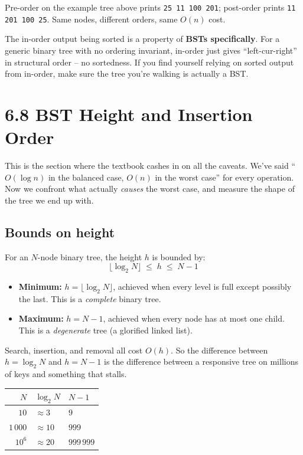 \documentclass[11pt]{article}
\begin{document}
Pre-order on the example tree above prints \texttt{25 11 100 201}; post-order prints \texttt{11 201 100 25}. Same nodes, different orders, same $O(n)$ cost.

\begin{warnbox}
The in-order output being sorted is a property of \textbf{BSTs specifically}. For a generic binary tree with no ordering invariant, in-order just gives ``left-cur-right'' in structural order -- no sortedness. If you find yourself relying on sorted output from in-order, make sure the tree you're walking is actually a BST.
\end{warnbox}

\section{6.8 BST Height and Insertion Order}

This is the section where the textbook cashes in on all the caveats. We've said ``$O(\log n)$ in the balanced case, $O(n)$ in the worst case'' for every operation. Now we confront what actually \emph{causes} the worst case, and measure the shape of the tree we end up with.

\subsection*{Bounds on height}

For an $N$-node binary tree, the height $h$ is bounded by:
\[
\lfloor \log_2 N \rfloor \;\le\; h \;\le\; N - 1
\]

\begin{itemize}[leftmargin=*]
    \item \textbf{Minimum:} $h = \lfloor \log_2 N \rfloor$, achieved when every level is full except possibly the last. This is a \emph{complete} binary tree.
    \item \textbf{Maximum:} $h = N - 1$, achieved when every node has at most one child. This is a \emph{degenerate} tree (a glorified linked list).
\end{itemize}

Search, insertion, and removal all cost $O(h)$. So the difference between $h = \log_2 N$ and $h = N-1$ is the difference between a responsive tree on millions of keys and something that stalls.

\begin{center}
\small
\begin{tabular}{rll}
$N$ & $\log_2 N$ & $N - 1$ \\
\hline
$10$    & $\approx 3$   & $9$ \\
$1\,000$   & $\approx 10$  & $999$ \\
$10^6$  & $\approx 20$  & $999\,999$ \\
\end{tabular}
\end{center}
\end{document}
